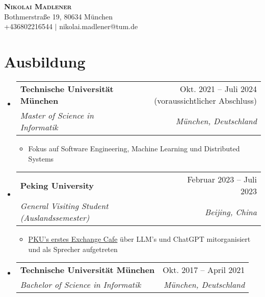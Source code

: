 \documentclass[letterpaper,11pt]{article}
\makeatletter
\newcommand{\resumeItem}[1]{
  \item\small{
    {#1 \vspace{-2pt}}
  }
}
\newcommand{\resumeSubheading}[4]{
  \vspace{-2pt}\item
    \begin{tabular*}{0.97\textwidth}[t]{l@{\extracolsep{\fill}}r}
      \textbf{#1} & #2 \\
      \textit{\small#3} & \textit{\small #4} \\
    \end{tabular*}\vspace{-7pt}
}
\newcommand{\resumeSubHeadingListStart}{\begin{itemize}[leftmargin=0.15in, label={}]}
\newcommand{\resumeSubHeadingListEnd}{\end{itemize}}
\newcommand{\resumeItemListStart}{\begin{itemize}}
\newcommand{\resumeItemListEnd}{\end{itemize}\vspace{-5pt}}
\makeatother
\begin{document}

\begin{center}
    \textbf{\Huge \scshape Nikolai Madlener} \\ \vspace{1pt}
    \small Bothmerstraße 19, 80634 München\\ 
    \small +436802216544 $|$ {{nikolai.madlener@tum.de}}
    
\end{center}


\section{Ausbildung}  
\resumeSubHeadingListStart
  \resumeSubheading
      {Technische Universität München}{Okt. 2021 -- Juli 2024 (voraussichtlicher Abschluss)}
      {Master of Science in Informatik}{München, Deutschland}
      \resumeItemListStart
        \resumeItem{Fokus auf Software Engineering, Machine Learning und Distributed Systems}
      \resumeItemListEnd
    \resumeSubheading
      {Peking University}{Februar 2023 -- Juli 2023}
      {General Visiting Student (Auslandssemester)}{Beijing, China}
      \resumeItemListStart
        \resumeItem{\href{https://newsen.pku.edu.cn/news_events/news/campus/13276.html}{PKU's erstes Exchange Cafe} über LLM's und ChatGPT mitorganisiert und als Sprecher aufgetreten}
      \resumeItemListEnd

    \resumeSubheading
      {Technische Universität München}{Okt. 2017 -- April 2021}
      {Bachelor of Science in Informatik}{München, Deutschland}
  \resumeSubHeadingListEnd
\end{document}
